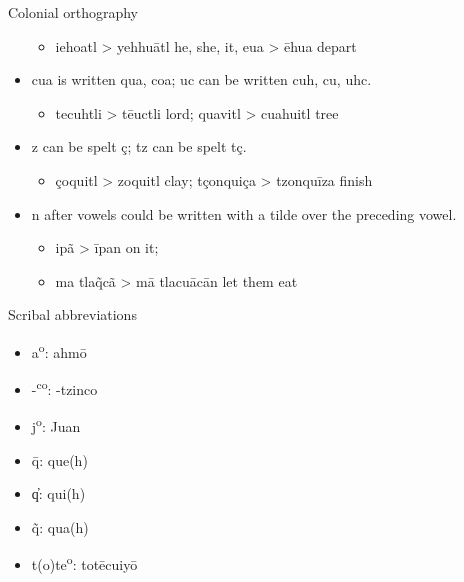 \documentclass[12pt]{beamer}
\newcommand{\nah}[1]{\textcolor{nahgrn}{#1}}
\newcommand{\trs}[1]{\textcolor{nahblu}{#1}}
\begin{document}
\begin{frame}
\begin{columns}[t]
\begin{column}{.23\linewidth}
\begin{block}{Colonial orthography}
\begin{itemize}
\begin{itemize}
                  \item \nah{iehoatl} > \nah{yehhuātl} \trs{he, she, it}, \nah{eua} > \nah{ēhua} \trs{depart}
                \end{itemize}
          \item \nah{cua} is written \nah{qua, coa}; \nah{uc} can be written \nah{cuh, cu, uhc}.
                \begin{itemize}
                  \item \nah{tecuhtli} > \nah{tēuctli} \trs{lord}; \nah{quavitl} > \nah{cuahuitl} \trs{tree}
                \end{itemize}
          \item \nah{z} can be spelt \nah{ç}; \nah{tz} can be spelt \nah{tç}.
                \begin{itemize}
                  \item \nah{çoquitl} > \nah{zoquitl} \trs{clay}; \nah{tçonquiça} > \nah{tzonquīza} \trs{finish}
                \end{itemize}
          \item \nah{n} after vowels could be written with a tilde over the preceding vowel.
                \begin{itemize}
                  \item \nah{ipã} > \nah{īpan} \trs{on it};
                  \item \nah{ma tla\~qcã} > \nah{mā tlacuācān} \trs{let them eat}
                \end{itemize}
        \end{itemize}
      \end{block}
      \begin{block}{Scribal abbreviations}
        \vspace{-1.5ex}
        \begin{multicols}{2}
          \begin{itemize}
            \item \nah{a\textsuperscript{o}}: \nah{ahmō}
            \item \nah{-\textsuperscript{co}}: \nah{-tzinco}
            \item \nah{j\textsuperscript{o}}: \nah{Juan}
            \item \nah{\={q}}: \nah{que(h)}
            \item \nah{‍q̓}: \nah{qui(h)}
            \item \nah{\~{q}}: \nah{qua(h)}
            \item \nah{t(o)te\textsuperscript{o}}: \nah{totēcuiyō}

\end{itemize}
\end{multicols}
\end{block}
\end{column}
\end{columns}
\end{frame}
\end{document}
